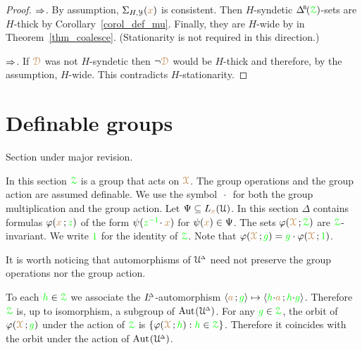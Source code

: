 \begin{proof}
  $\Rightarrow$.
  By assumption, $\Sigma_{H,\EuScript Y}({\color{brown} x})$ is consistent.
  Then $H$-syndetic $\BDelta({\grZ})$-sets are $H$-thick by Corollary~\ref{corol_def_mu}.
  Finally, they are  $H$-wide by  in Theorem~\ref{thm_coalesce}.
  (Stationarity is not required in this direction.)

  $\Rightarrow$.
  If ${\color{brown}\EuScript D}$ was not $H$-syndetic then $\neg{\color{brown}\EuScript D}$ would be $H$-thick and therefore, by the assumption, $H$-wide.
  This contradicts $H$-stationarity.
\end{proof}

\section{Definable groups}\label{definablegroups}

\def\medrel#1{\parbox[t]{5ex}{$\displaystyle\hfil #1$}}
\def\ceq#1#2#3{\parbox[t]{25ex}{$\displaystyle #1$}\medrel{#2}{$\displaystyle #3$}}

\noindent\llap{\textcolor{red}{\Large\warning}\kern1.5ex}\ignorespaces
Section under major revision.

In this section ${\color{green}\EuScript Z}$ is a group that acts on ${\color{brown}\EuScript X}$.
The group operations and the group action are assumed definable.
We use the symbol $\,\cdot\,$ for both the group multiplication and the group action.
Let $\Psi\subseteq L_{\color{brown} x}(\EuScript U)$.
In this section $\Delta$ contains formulas $\varphi({\color{brown} x}\,;{\color{green} z})$ of the form  $\psi({\color{green} z^{-1}}\!\cdot{\color{brown}x})$ for $\psi({\color{brown} x})\in\Psi$.
The sets $\varphi({\color{brown}\EuScript X}\,;{\color{green}\EuScript Z})$ are ${\color{green}\EuScript Z}$-invariant.
We write ${\color{green} 1}$ for the identity of ${\color{green}\EuScript Z}$.
Note that $\varphi({\color{brown}\EuScript X}\,;{\color{green} g})={\color{green} g}\cdot\varphi({\color{brown}\EuScript X}\,;{\color{green} 1})$.

It is worth noticing that automorphisms of $\EuScript U\kern-.2ex^{\scriptscriptstyle\Delta}$ need not preserve the group operations nor the group action.

To each ${\color{green} h}\in{\color{green}\EuScript Z}$ we associate the $L\kern-.5ex^{\scriptscriptstyle\Delta}$-automorphism $\langle{\color{brown}a}\,;{\color{green} g}\rangle\mapsto\langle{\color{green}h}{\cdot}{\color{brown}a}\,;{\color{green} h}{\cdot}{\color{green} g}\rangle$.
Therefore ${\color{green}\EuScript Z}$ is, up to isomorphism, a subgroup of ${\rm Aut\kern.15ex}(\EuScript U\kern-.2ex^{\scriptscriptstyle\Delta})$.
For any ${\color{green} g}\in{\color{green}\EuScript Z}$, the orbit of $\varphi({\color{brown}\EuScript X}\,;{\color{green} g})$ under the action of ${\color{green}\EuScript Z}$ is $\{\varphi({\color{brown}\EuScript X}\,;{\color{green} h}) : {\color{green} h}\in{\color{green}\EuScript Z}\}$.
Therefore it coincides with the orbit under the action of ${\rm Aut\kern.15ex}(\EuScript U\kern-.2ex^{\scriptscriptstyle\Delta})$.

